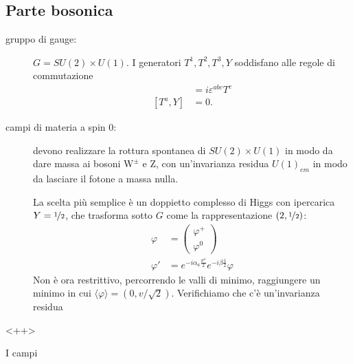 \documentclass[italian,a4paper]{article}
\theoremstyle{definition}
\begin{document}
\subsection{Parte bosonica}
\begin{description}
    \item[gruppo di gauge:]
$G = SU(2) \times U(1)$. I generatori $T^1,T^2, T^3, Y$ soddisfano alle regole di commutazione
\begin{align*}
    [T^a, T^b] &= i \varepsilon^{abc}T^c\\
    [T^a, Y] &= 0.
\end{align*}
\item[campi di materia a spin $0$:] devono realizzare la rottura spontanea
    di $SU(2)\times U(1)$ in modo da dare massa ai bosoni $\mathrm{W^{\pm}}$ e
    $\mathrm{Z}$, con un'invarianza residua $U(1)_{em}$ in modo da lasciare
    il fotone a massa nulla.

    La scelta pi\`u semplice \`e un doppietto complesso di Higgs con
    ipercarica $Y = \nicefrac{1}{2}$, che trasforma sotto $G$ come la
    rappresentazione $(2, \nicefrac{1}{2})$:
    \begin{align*}
        \varphi &= 
        \begin{pmatrix}
            \varphi^+ \\
            \varphi^0
        \end{pmatrix}\\
        \varphi' &= e^{-i \alpha_a \frac{\sigma^a}{2}}e^{-i\beta
        \frac{1}{2}}\varphi
    \end{align*}
    Non \`e ora restrittivo, percorrendo le valli di minimo, raggiungere un
    minimo in cui $\langle \varphi \rangle = (0, v/\sqrt{2})$. Verifichiamo
    che c'\`e un'invarianza residua
\end{description}<++>

I campi 
\end{document}
